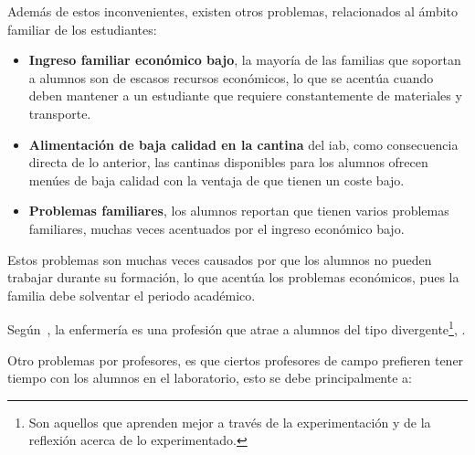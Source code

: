 Además de estos inconvenientes, existen otros problemas, relacionados al ámbito
familiar de los estudiantes\cite{iab:tesis_alumnos}:

\begin{itemize}
    \item \textbf{Ingreso familiar económico bajo}, la mayoría de las familias que
        soportan a alumnos son de escasos recursos económicos, lo que se acentúa
        cuando deben mantener a un estudiante que requiere constantemente de
        materiales y transporte.
    \item \textbf{Alimentación de baja calidad en la cantina} del \Gls{iab}, como
        consecuencia directa de lo anterior, las cantinas disponibles para los
        alumnos ofrecen menúes de baja calidad con la ventaja de que tienen un
        coste bajo.
    \item \textbf{Problemas familiares}, los alumnos reportan que tienen varios
        problemas familiares, muchas veces acentuados por el ingreso económico
        bajo.
\end{itemize}


Estos problemas son muchas veces causados por que los alumnos no pueden trabajar
durante su formación, lo que acentúa los problemas económicos, pues la familia
debe solventar el periodo académico.

Según~\cite{humphreys2013developing}, la enfermería es una profesión que
    atrae a alumnos del tipo divergente\footnote{Son aquellos que aprenden mejor
        a través de la experimentación y de la reflexión acerca de lo
        experimentado.}, .

Otro problemas  por
profesores, es que ciertos profesores de campo prefieren tener tiempo con los
alumnos en el laboratorio, esto se debe principalmente a:

